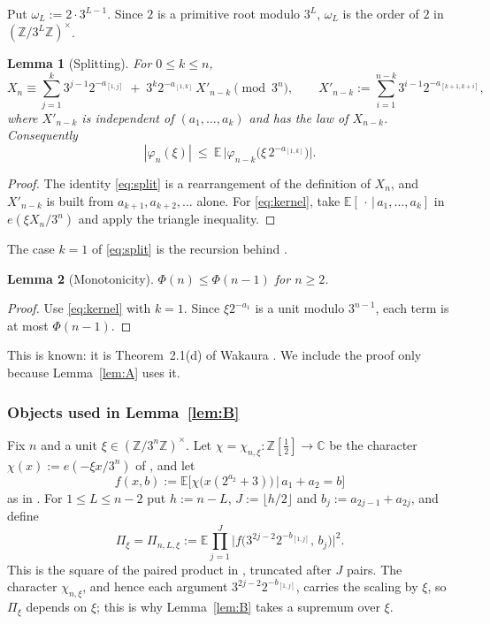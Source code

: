 \documentclass[11pt]{amsart}
\newtheorem{lemma}{Lemma}[section]
\theoremstyle{remark}
\newcommand{\E}{\mathbb{E}}
\newcommand{\Z}{\mathbb{Z}}
\newcommand{\T}[1]{\cite[#1]{Tao22}}   %
\theoremstyle{plain}
\begin{document}
Put $\omega_L:=2\cdot3^{L-1}$. Since $2$ is a primitive root modulo $3^L$, $\omega_L$ is the order of $2$ in $(\Z/3^L\Z)^\times$.

\begin{lemma}[Splitting]\label{lem:split}
For $0\le k\le n$,
\begin{equation}\label{eq:split}
X_n\equiv \sum_{j=1}^{k}3^{j-1}2^{-a_{[1,j]}}\;+\;3^{k}2^{-a_{[1,k]}}\,X'_{n-k}\pmod{3^n},\qquad X'_{n-k}:=\sum_{i=1}^{n-k}3^{i-1}2^{-a_{[k+1,k+i]}},
\end{equation}
where $X'_{n-k}$ is independent of $(a_1,\dots,a_k)$ and has the law of $X_{n-k}$. Consequently
\begin{equation}\label{eq:kernel}
|\varphi_n(\xi)|\ \le\ \E\,\big|\varphi_{n-k}\big(\xi\,2^{-a_{[1,k]}}\big)\big| .
\end{equation}
\end{lemma}

\begin{proof}
The identity \eqref{eq:split} is a rearrangement of the definition of $X_n$, and $X'_{n-k}$ is built from $a_{k+1},a_{k+2},\dots$ alone. For \eqref{eq:kernel}, take $\E[\,\cdot\,|\,a_1,\dots,a_k]$ in $e(\xi X_n/3^n)$ and apply the triangle inequality.
\end{proof}

The case $k=1$ of \eqref{eq:split} is the recursion behind \T{Lemma 1.12}.

\begin{lemma}[Monotonicity]\label{lem:mono}
$\Phi(n)\le\Phi(n-1)$ for $n\ge2$.
\end{lemma}

\begin{proof}
Use \eqref{eq:kernel} with $k=1$. Since $\xi2^{-a_1}$ is a unit modulo $3^{n-1}$, each term is at most $\Phi(n-1)$.
\end{proof}

This is known: it is Theorem~2.1(d) of Wakaura \cite{Wak26}. We include the proof only because Lemma~\ref{lem:A} uses it.

\subsubsection*{Objects used in Lemma~\ref{lem:B}}
Fix $n$ and a unit $\xi\in(\Z/3^n\Z)^\times$. Let $\chi=\chi_{n,\xi}\colon\Z[\tfrac12]\to\mathbb C$ be the character $\chi(x):=e(-\xi x/3^n)$ of \T{(7.1)}, and let
\[
f(x,b):=\E\big[\chi\big(x(2^{a_2}+3)\big)\,\big|\,a_1+a_2=b\big]
\]
as in \T{(7.4)}. For $1\le L\le n-2$ put $h:=n-L$, $J:=\lfloor h/2\rfloor$ and $b_j:=a_{2j-1}+a_{2j}$, and define
\[
\Pi_\xi=\Pi_{n,L,\xi}:=\E\prod_{j=1}^{J}\Big|f\big(3^{2j-2}2^{-b_{[1,j]}},\,b_j\big)\Big|^2 .
\]
This is the square of the paired product in \T{(7.5)}, truncated after $J$ pairs. The character $\chi_{n,\xi}$, and hence each argument $3^{2j-2}2^{-b_{[1,j]}}$, carries the scaling by $\xi$, so $\Pi_\xi$ depends on $\xi$; this is why Lemma~\ref{lem:B} takes a supremum over $\xi$.
\end{document}
